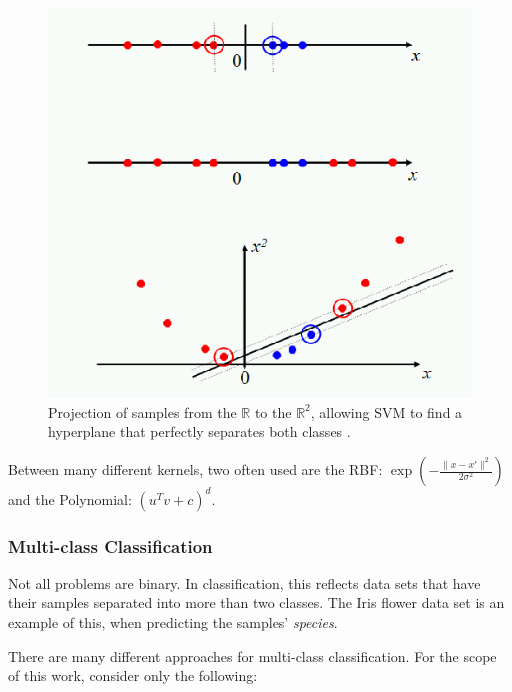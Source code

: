 \documentclass[12pt]{article}
\begin{document}
\begin{figure}[H]
	\centering
	\captionsetup{justification=centering}

	\includegraphics[scale=.4]{svm_kernel}
	\caption{Projection of samples from the $\mathbb{R}$ to the $\mathbb{R}^2$, allowing SVM to find a hyperplane that perfectly separates both classes \cite{svmkernels}.}
	\label{fig:svmkernel}
\end{figure}

Between many different kernels, two often used are the RBF: $\exp(-\frac{\|x -x'\|^2}{2\sigma^2})$ and the Polynomial: $(u^T v + c)^{d}$. \cite{svmkernels}

\subsubsection{Multi-class Classification}

Not all problems are binary. In classification, this reflects data sets that have their samples separated into more than two classes. The Iris flower data set is an example of this, when predicting the samples' {\em species}.

There are many different approaches for multi-class classification. \cite{rif2008} For the scope of this work, consider only the following:
\end{document}
